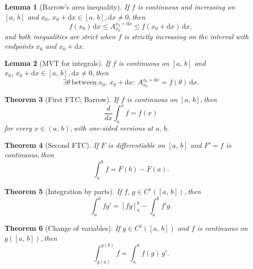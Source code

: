 \documentclass[11pt,reqno]{amsart}
\newcommand{\comma}{,\,\allowbreak}
\theoremstyle{redplain}
\newtheorem{theorem}{Theorem}
\newtheorem{lemma}[theorem]{Lemma}
\begin{document}
\begin{lemma}[Barrow's area inequality]
	\label{lem:barrow-area}
	If $f$ is continuous and increasing on $[a\comma b]$ and $x_0\comma x_0+\mathrm{d}x\in[a\comma b]$\comma $\mathrm{d}x\ne0$\comma then
	\begin{equation}\label{eq:barrow-area}
	f(x_0)\,\mathrm{d}x\le A_{x_0}^{x_0+\mathrm{d}x}\le f(x_0+\mathrm{d}x)\,\mathrm{d}x,
	\end{equation}
	and both inequalities are strict when $f$ is strictly increasing on the interval with endpoints $x_0$ and $x_0+\mathrm{d}x$.
\end{lemma}

\begin{lemma}[MVT for integrals]
	\label{lem:mvt-int}
	If $f$ is continuous on $[a\comma b]$ and $x_0\comma x_0+\mathrm{d}x\in[a\comma b]$\comma $\mathrm{d}x\ne0$\comma then
	\begin{equation}\label{eq:mvt-int}
	\exists\theta\ \text{between}\ x_0\comma x_0+\mathrm{d}x:\ A_{x_0}^{x_0+\mathrm{d}x}=f(\theta)\,\mathrm{d}x.
	\end{equation}
\end{lemma}

\begin{theorem}[First FTC; Barrow]
	\label{thm:fftc}
	If $f$ is continuous on $[a\comma b]$\comma then
	\begin{equation}\label{eq:fftc}
	\frac{d}{dx}\int_a^x f=f(x)
	\end{equation}
	for every $x\in(a\comma b)$\comma with one-sided versions at $a\comma b$.
\end{theorem}

\begin{theorem}[Second FTC]
	\label{thm:second-ftc}
	If $F$ is differentiable on $[a\comma b]$ and $F'=f$ is continuous\comma then
	\begin{equation}\label{eq:second-ftc}
	\int_a^b f=F(b)-F(a).
	\end{equation}
\end{theorem}

\begin{theorem}[Integration by parts]
	\label{thm:ibp}
	If $f\comma g\in C^1([a\comma b])$\comma then
	\begin{equation}\label{eq:ibp}
	\int_a^b fg'=[fg]_a^b-\int_a^b f'g.
	\end{equation}
\end{theorem}

\begin{theorem}[Change of variables]
	\label{thm:subst}
	If $g\in C^1([a\comma b])$ and $f$ is continuous on $g([a\comma b])$\comma then
	\begin{equation}\label{eq:subst}
	\int_{g(a)}^{g(b)}f=\int_a^b f(g)\,g'.
	\end{equation}
\end{theorem}
\end{document}
